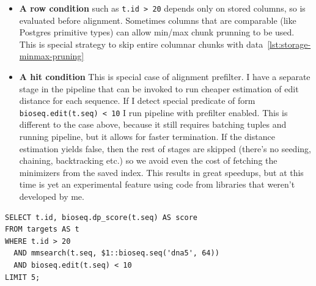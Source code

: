 \begin{itemize}
  \item \textbf{A row condition} such as \texttt{t.id > 20} depends only on
    stored columns, so is evaluated before alignment. Sometimes columns that are comparable (like Postgres primitive types) can allow min/max chunk prunning to be used.
    This is special strategy to skip entire columnar chunks with data~\ref{lst:storage-minmax-pruning}
  \item \textbf{A hit condition} This is special case of alignment prefilter. I have a separate stage in the pipeline that can be invoked to run cheaper estimation of edit distance for each sequence.
  If I detect special predicate of form   
  \texttt{bioseq.edit(t.seq) < 10} I run pipeline with prefilter enabled. This is different to the case above, because it still requires batching tuples and running pipeline, but it allows for faster termination.
  If the distance estimation yields false, then the rest of stages are skipped (there's no seeding, chaining, backtracking etc.) so we avoid even the cost of fetching the minimizers from the saved index.
  This results in great speedups, but at this time is yet an experimental feature using code from libraries that weren't developed by me.
\label{lst:prefilter-condition}
\end{itemize}

\noindent\begin{minipage}{\linewidth}
\begin{lstlisting}[style=bioseq-search-sql,caption={Filter input rows and then filter alignment hits.}]
SELECT t.id, bioseq.dp_score(t.seq) AS score
FROM targets AS t
WHERE t.id > 20
  AND mmsearch(t.seq, $1::bioseq.seq('dna5', 64))
  AND bioseq.edit(t.seq) < 10
LIMIT 5;
\end{lstlisting}
\end{minipage}

